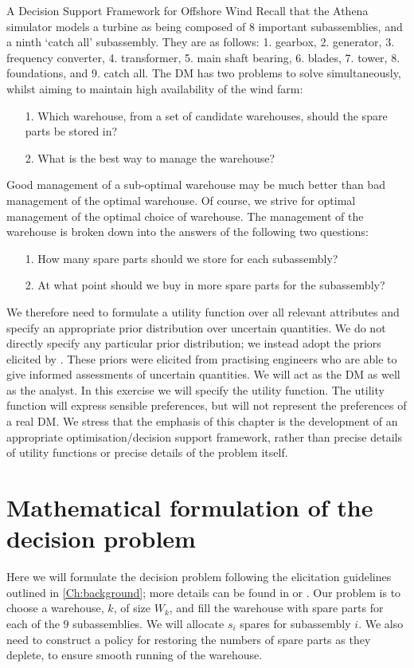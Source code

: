 \begin{chapter}{A Decision Support Framework for Offshore Wind \label{Ch:ds-for-ow}}
Recall that the Athena simulator models a turbine as being composed of $8$ important subassemblies, and a ninth `catch all' subassembly. They are as follows: 1. gearbox, 2. generator, 3. frequency converter, 4. transformer, 5. main shaft bearing, 6. blades, 7. tower, 8. foundations, and 9. catch all. The DM has two problems to solve simultaneously, whilst aiming to maintain high availability of the wind farm:
\begin{itemize}
 \item[1.] Which warehouse, from a set of candidate warehouses, should the spare parts be stored in?
 \item[2.] What is the best way to manage the warehouse?
\end{itemize}
Good management of a sub-optimal warehouse may be much better than bad management of the optimal warehouse. Of course, we strive for optimal management of the optimal choice of warehouse. The management of the warehouse is broken down into the answers of the following two questions:
\begin{itemize}
 \item[1.] How many spare parts should we store for each subassembly?
 \item[2.] At what point should we buy in more spare parts for the subassembly?
\end{itemize}
We therefore need to formulate a utility function over all relevant attributes and specify an appropriate prior distribution over uncertain quantities. We do not directly specify any particular prior distribution; we instead adopt the priors elicited by \citet{Zit2021}. These priors were elicited from practising engineers who are able to give informed assessments of uncertain quantities. We will act as the DM as well as the analyst. In this exercise we will specify the utility function. The utility function will express sensible preferences, but will not represent the preferences of a real DM. We stress that the emphasis of this chapter is the development of an appropriate optimisation/decision support framework, rather than precise details of utility functions or precise details of the problem itself.

\section{Mathematical formulation of the decision problem}
Here we will formulate the decision problem following the elicitation guidelines outlined in \cref{Ch:background}; more details can be found in \citet{Smith2010} or \citet{Keeney1976}. Our problem is to choose a warehouse, $k$, of size $W_k$, and fill the warehouse with spare parts for each of the $9$ subassemblies. We will allocate $s_i$ spares for subassembly $i$. We also need to construct a policy for restoring the numbers of spare parts as they deplete, to ensure smooth running of the warehouse.


\end{chapter}
